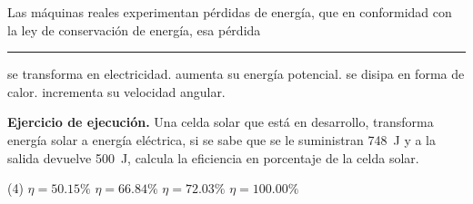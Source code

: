 \documentclass[12pt, letter]{exam}
\begin{document}
\begin{questions}
    \question Las máquinas reales experimentan pérdidas de energía, que en conformidad con la ley de conservación de energía, esa pérdida \rule{2cm}{0.1mm}
    \begin{multicols}{2}
    \begin{tasks}
        \task se transforma en electricidad.
        \task aumenta su energía potencial.
        \task se disipa en forma de calor.
        \task incrementa su velocidad angular.
    \end{tasks}
    \end{multicols}
    \question \label{Ejercicio_15} \textbf{Ejercicio de ejecución. } Una celda solar que está en desarrollo, transforma energía solar a energía eléctrica, si se sabe que se le suministran \SI{748}{\joule} y a la salida devuelve \SI{500}{\joule}, calcula la eficiencia en porcentaje de la celda solar.
    \begin{tasks}(4)
        \task $\eta = 50.15 \%$
        \task $\eta = 66.84 \%$
        \task $\eta = 72.03 \%$
        \task $\eta = 100.00 \%$
    \end{tasks}
    \end{questions}

    \newpage
\end{document}
